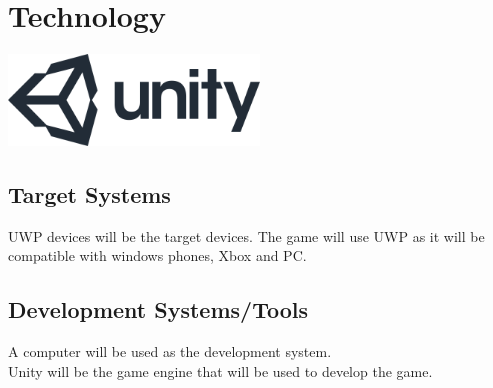 \documentclass[a4paper]{scrreprt}
\begin{document}
\chapter{Technology}

\includegraphics[width=0.50\textwidth]{Unity}

\section{Target Systems}

UWP devices will be the target devices. The game will use UWP as it will be compatible with windows phones, Xbox and PC.

\section{Development Systems/Tools}

A computer will be used as the development system. \\
Unity will be the game engine that will be used to develop the game. \\
\end{document}
